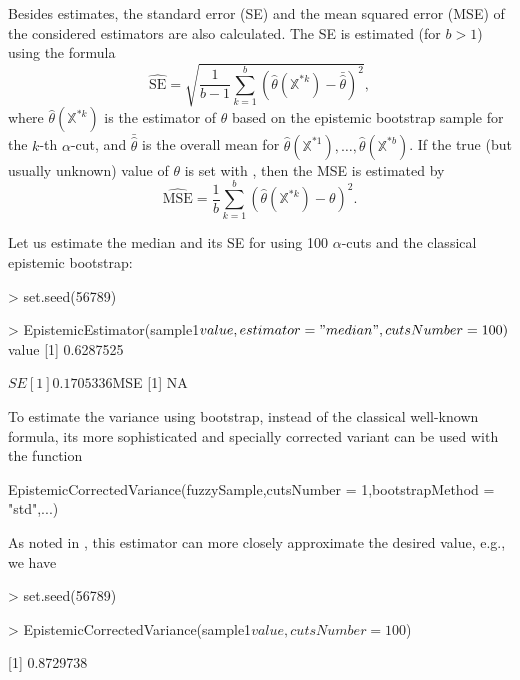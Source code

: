 Besides estimates, the standard error (SE) and the mean squared error (MSE) of the considered estimators are also calculated.
The SE is estimated (for $b >1$) using the formula
\begin{equation}
\label{frachetse}
	\widehat{\mathrm{SE}}=\sqrt{\frac{1}{b-1} \sum_{k=1}^{b} \left ( \hat{\theta} \left (\mathbb{X}^{*k} \right) - \bar{\hat{\theta}} \right )^2}  ,
\end{equation}
where $\hat{\theta} \left (\mathbb{X}^{*k} \right) $ is the estimator of $\theta$ based on the epistemic bootstrap sample for the $k$-th $\alpha$-cut, and $\bar{\hat{\theta}}$ is the overall mean for $\hat{\theta} \left (\mathbb{X}^{*1} \right),\ldots,\hat{\theta} \left (\mathbb{X}^{*b} \right)$.
If the true (but usually unknown) value of $\theta$ is set with , then the MSE is estimated by
\begin{equation}
\label{frachetmse}
	\widehat{\mathrm{MSE}}=\frac{1}{b} \sum_{k=1}^{b} \left ( \hat{\theta} \left (\mathbb{X}^{*k} \right) - \theta \right )^2 .
\end{equation}

Let us estimate the median and its SE for  using 100 $\alpha$-cuts and the classical epistemic bootstrap:
\begin{example}
> set.seed(56789)

> EpistemicEstimator(sample1$value, estimator = "median",cutsNumber = 100)

$value
[1] 0.6287525

$SE
[1] 0.1705336

$MSE
[1] NA
\end{example} 

To estimate the variance using bootstrap, instead of the classical well-known formula, its more sophisticated and specially corrected variant \citep{pgmr2022} can be used with the function
\begin{example}
EpistemicCorrectedVariance(fuzzySample,cutsNumber = 1,bootstrapMethod = "std",...)
\end{example}
As noted in \cite{pgmr2022}, this estimator can more closely approximate the desired value, e.g., we have
\begin{example}
> set.seed(56789)

> EpistemicCorrectedVariance(sample1$value, cutsNumber = 100$)

[1] 0.8729738
\end{example} 




